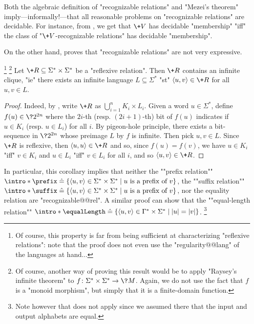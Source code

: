 Both the algebraic definition of "recognizable relations" and
"Mezei's theorem" imply---informally!---that all reasonable problems on
"recognizable relations" are decidable. For instance, from ,
we get that $\+V$ has decidable "membership" "iff" the class of "$\+V$-recognizable relations"
has decidable "membership".

On the other hand,  proves that "recognizable relations" are not very expressive.
\begin{corollary}
	\!\footnote{Of course, this property is far from being sufficient
	at characterizing "reflexive relations": note that the proof
	does not even use the "regularity@@lang" of the languages at hand...}%
	\footnote{Of course, another way of proving this result would be
	to apply "Raysey's infinite theorem" to $f\colon \Sigma^* \times \Sigma^* \to \?M$.
	Again, we do not use the fact that $f$ is a "monoid morphism", but simply
	that it is a finite-domain function.}
	\AP\label{coro:infinite-clique-recognizable}
	Let $\+R \subseteq \Sigma^* \times \Sigma^*$ be a "reflexive relation".
	Then $\+R$ contains an infinite clique, "ie"
	there exists an infinite language $L \subseteq \Sigma^*$ "st"
	$\tup{u,v} \in \+R$ for all $u,v \in L$.
\end{corollary}
\begin{proof}
	Indeed, by , write $\+R$ as $\bigcup_{i=1}^n K_i \times L_i$.
	Given a word $u \in \Sigma^*$, define $f(u) \in \?2^{2n}$ where
	the $2i$-th (resp. $(2i+1)$-th) bit of $f(u)$ indicates if $u \in K_i$ (resp. $u \in L_i$)
	for all $i$.
	By pigeon-hole principle, there exists a bit-sequence in $\?2^{2n}$ whose preimage
	$L$ by $f$ is infinite. Then pick $u,v \in L$. Since $\+R$ is reflexive, then
	$\tup{u,u} \in \+R$ and so, since $f(u) = f(v)$, we
	have $u \in K_i$ "iff" $v \in K_i$ and
	$u \in L_i$ "iff" $v \in L_i$ for all $i$, and so $\tup{u,v} \in \+R$.
\end{proof}

In particular, this corollary implies that neither the \AP""prefix relation""
${\intro*\prefix} \defeq \{
	\tup{u,v} \in \Sigma^*\times\Sigma^* \mid
	\text{$u$ is a prefix of $v$}
\}$, the \AP""suffix relation""
${\intro*\suffix} \defeq \{
	\tup{u,v} \in \Sigma^*\times\Sigma^* \mid
	\text{$u$ is a prefix of $v$}
\}$, nor the equality relation are "recognizable@@rel".
A similar proof can show that the ""equal-length relation""
$\intro*\equalLength \defeq \{
	\tup{u,v} \in \Gamma^*\times\Sigma^* \mid
	|u| = |v|
\}$.%
\footnote{Note however that  does not apply since
we assumed there that the input and output alphabets are equal.}



